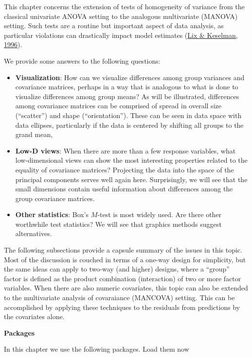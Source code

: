 \documentclass[
  letterpaper,
  10pt,
  krantz2]{krantz}
\begin{document}
This chapter concerns the extension of tests of homogeneity of variance
from the classical univariate ANOVA setting to the analogous
multivariate (MANOVA) setting. Such tests are a routine but important
aspect of data analysis, as particular violations can drastically impact
model estimates (\protect\hyperlink{ref-Lix:1996}{Lix \& Keselman,
1996}).

We provide some answers to the following questions:

\begin{itemize}
\item
  \textbf{Visualization}: How can we visualize differences among group
  variances and covariance matrices, perhaps in a way that is analogous
  to what is done to visualize differences among group means? As will be
  illustrated, differences among covariance matrices can be comprised of
  spread in overall size (``scatter'') and shape (``orientation'').
  These can be seen in data space with data ellipses, particularly if
  the data is centered by shifting all groups to the grand mean,
\item
  \textbf{Low-D views}: When there are more than a few response
  variables, what low-dimensional views can show the most interesting
  properties related to the equality of covariance matrices? Projecting
  the data into the space of the principal components serves well again
  here. Surprisingly, we will see that the small dimensions contain
  useful information about differences among the group covariance
  matrices.
\item
  \textbf{Other statistics}: Box's \(M\)-test is most widely used. Are
  there other worthwhile test statistics? We will see that graphics
  methods suggest alternatives.
\end{itemize}

The following subsections provide a capsule summary of the issues in
this topic. Most of the discussion is couched in terms of a one-way
design for simplicity, but the same ideas can apply to two-way (and
higher) designs, where a ``group'' factor is defined as the product
combination (interaction) of two or more factor variables. When there
are also numeric covariates, this topic can also be extended to the
multivariate analysis of covaraiance (MANCOVA) setting. This can be
accomplished by applying these techniques to the residuals from
predictions by the covariates alone.

\textbf{Packages}

In this chapter we use the following packages. Load them now
\end{document}
